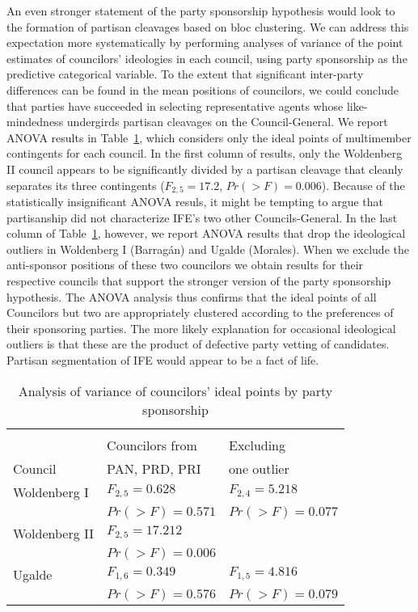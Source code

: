 \documentclass[12 pt, letter]{article}
\begin{document}
An even stronger statement of the party sponsorship hypothesis would
look to the formation of partisan cleavages based on bloc
clustering.  We can address this expectation more systematically by
performing analyses of variance of the point estimates of
councilors' ideologies in each council, using party sponsorship as
the predictive categorical variable.  To the extent that significant
inter-party differences can be found in the mean positions of
councilors, we could conclude that parties have succeeded in
selecting representative agents whose like-mindedness undergirds
partisan cleavages on the Council-General.  We report ANOVA results
in Table~\ref{T:anova}, which considers only the ideal points of
multimember contingents for each council.  In the first column of
results, only the Woldenberg II council appears to be significantly
divided by a partisan cleavage that cleanly separates its three
contingents ($F_{2,5}=17.2$, $Pr(>F)=0.006$).  Because of the statistically insignificant ANOVA resuls, it might be tempting to argue that partisanship did not characterize IFE's two other Councils-General.  In the last column of Table~\ref{T:anova}, however, we report ANOVA results that drop the ideological outliers in Woldenberg I (Barrag\'an) and Ugalde (Morales).  When we exclude the anti-sponsor positions of these two councilors we obtain results for their respective councils that support the stronger version of the party sponsorship hypothesis.  The ANOVA analysis thus confirms that the ideal points of all Councilors but two are appropriately clustered according to the preferences of their sponsoring parties.  The more likely explanation for occasional ideological outliers is that these are the product of defective party vetting of candidates.  Partisan segmentation of IFE would appear to be a fact of life.

\begin{table}
\caption{Analysis of variance of councilors' ideal points by party sponsorship}\label{T:anova}
\begin{center}
\begin{tabular}{lll}
\hline\\[-1.5ex]
              & Councilors from & Excluding\\
Council       & PAN, PRD, PRI   & one outlier          \\  \hline
Woldenberg I  & $F_{2,5}=0.628$ & $F_{2,4}=5.218$ \\
              & $Pr(>F)=0.571$  & $Pr(>F)=0.077$  \\
Woldenberg II & $F_{2,5}=17.212$&  \\
              & $Pr(>F)=0.006$  &  \\
Ugalde        & $F_{1,6}=0.349$ & $F_{1,5}=4.816$ \\
              & $Pr(>F)=0.576$  & $Pr(>F)=0.079$ \\ \hline
\end{tabular}
\end{center}
\end{table}
\end{document}
